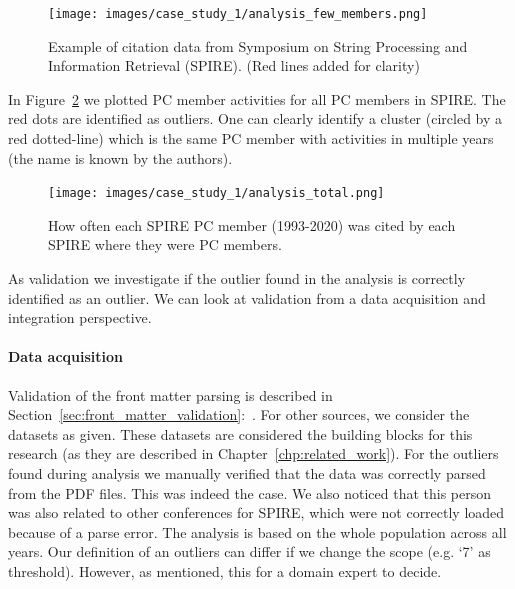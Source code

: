 \documentclass{ou-report}
\begin{document}
\begin{figure}[H]
    \centering
    \texttt{[image: images/case\_study\_1/analysis\_few\_members.png]}
    \caption{Example of citation data from Symposium on String Processing and 
    Information Retrieval (SPIRE). (Red lines added for clarity)}
    \label{fig:analysis_few}
\end{figure}

In Figure~\ref{fig:analysis_members} we plotted PC member activities for all PC 
members in SPIRE. The red dots are identified as outliers. One can clearly
identify a cluster (circled by a red dotted-line) which is the same PC member
with activities in multiple years (the name is known by the authors).

\begin{figure}[H]
    \centering
    \texttt{[image: images/case\_study\_1/analysis\_total.png]}
    \caption{How often each SPIRE PC member (1993-2020) was cited by each SPIRE where they were PC members.}
    \label{fig:analysis_members}
\end{figure}

As validation we investigate if the outlier found in the analysis is correctly 
identified as an outlier. We can look at validation from a data acquisition
and integration perspective.

\paragraph{Data acquisition}
Validation of the front matter parsing is described in 
Section~\ref{sec:front_matter_validation}:~.
%
For other sources, we consider the datasets as given. These datasets are 
considered the building blocks for this research (as they are described in 
Chapter~\ref{chp:related_work}).
%
For the outliers found during analysis we manually verified that the data was 
correctly parsed from the PDF files. This was
indeed the case. We also noticed that this person was also related to other
conferences
for SPIRE, which were not correctly loaded because of a parse error.
%
The analysis is based on the whole population across all years. 
Our definition of an outliers can differ if we change the scope (e.g. `7' as 
threshold). However, as mentioned, this for a domain expert to decide.
\end{document}
